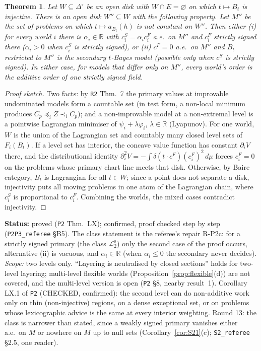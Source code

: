 \documentclass[11pt]{article}
\newtheorem{theorem}{Theorem}[section]
\theoremstyle{definition}
\theoremstyle{remark}
\newcommand{\R}{\mathbb R}
\newcommand{\Di}{\Delta^{\circ}}
\newcommand{\src}[1]{\texttt{#1}}
\newcommand{\status}[1]{\par\smallskip\noindent\textbf{Status:} #1\par\smallskip}
\newcommand{\Ltwo}{\mathcal L_2^{\mathrm s}}
\begin{document}
\begin{theorem}\label{thm:LX}
Let $W\subseteq\Di$ be an open disk with $W\cap E=\varnothing$ on which $t\mapsto B_t$ is injective. There is an open disk $W''\subseteq W$ with the following property. Let $M''$ be the set of problems on which $t\mapsto a_{B_t}(h)$ is not constant on $W''$. Then either (i) for every world $i$ there is $\alpha_i\in\R$ with $c^S_i=\alpha_ic^F_i$ a.e.\ on $M''$ and $c^F_i$ strictly signed there ($\alpha_i>0$ when $c^S_i$ is strictly signed), or (ii) $c^F=0$ a.e.\ on $M''$ and $B_t$ restricted to $M''$ is the secondary $t$-Bayes model (possible only when $c^S$ is strictly signed). In either case, for models that differ only on $M''$, every world's order is the additive order of one strictly signed field.
\end{theorem}
\begin{proof}[Proof sketch]
Two facts: by \src{R2} Thm.~7 the primary values at improvable undominated models form a countable set (in test form, a non-local minimum produces $C_p\preceq_iZ\prec_iC_p$); and a non-improvable model at a non-extremal level is a pointwise Lagrangian minimiser of $\psi_i+\lambda\varphi_i$, $\lambda\in\R$ (Lyapunov). For one world, $W$ is the union of the Lagrangian set and countably many closed level sets of $F_i(B_t)$. If a level set has interior, the concave value function has constant $\partial_iV$ there, and the distributional identity $\partial_i^2V=-\int\delta(t\cdot c^F)(c^F_i)^2\,d\mu$ forces $c^F_i=0$ on the problems whose primary chart line meets that disk. Otherwise, by Baire category, $B_t$ is Lagrangian for all $t\in W$; since a point does not separate a disk, injectivity puts all moving problems in one atom of the Lagrangian chain, where $c^S_i$ is proportional to $c^F_i$. Combining the worlds, the mixed cases contradict injectivity.
\end{proof}
\status{proved (\src{P2} Thm.~LX); confirmed, proof checked step by step (\src{P2P3\_referee} \S B5). The class statement is the referee's repair R-P2c: for a strictly signed primary (the class $\Ltwo$) only the second case of the proof occurs, alternative (ii) is vacuous, and $\alpha_i\in\R$ (when $\alpha_i\le0$ the secondary never decides). \emph{Scope:} two levels only. ``Layering is neutralised by closed sections'' holds for two-level layering; multi-level flexible worlds (Proposition~\ref{prop:flexible}(d)) are not covered, and the multi-level version is open (\src{P2} \S8, nearby result~1). Corollary LX.1 of \src{P2} (CHECKED, confirmed): the second level can do non-additive work only on thin (non-injective) regions, on a dense exceptional set, or on problems whose lexicographic advice is the same at every interior weighting. Round 13: the class is narrower than stated, since a weakly signed primary vanishes either a.e.\ on $M$ or nowhere on $M$ up to null sets (Corollary~\ref{cor:S21}(c); \src{S2\_referee} \S2.5, one reader).}
\end{document}
